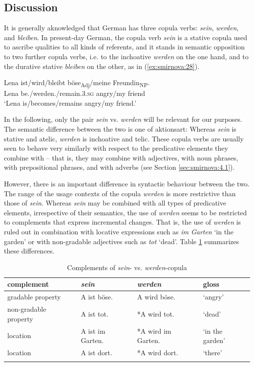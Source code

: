 \documentclass[output=paper,colorlinks,citecolor=brown]{langscibook}
\begin{document}
\subsection{Discussion} \label{sec:smirnova:4.3}
It is generally aknowledged that German has three copula verbs: \textit{sein}, \textit{werden}, and \textit{bleiben}. In present-day German, the copula verb \emph{sein} is a stative copula used to ascribe qualities to all kinds of referents, and it stands in semantic opposition to two further copula verbs, i.e. to the inchoative \emph{werden} on the one hand, and to the durative stative \emph{bleiben} on the other, as in (\ref{ex:smirnova:28}).

\ea\label{ex:smirnova:28}
\gll Lena ist/wird/bleibt böse\textsubscript{Adj}/meine Freundin\textsubscript{NP}.\\
    Lena be./werden./remain.\textsc{3.sg} angry/my friend \\
\glt `Lena is/becomes/remains angry/my friend.'
\z

In the following, only the pair \emph{sein} vs. \emph{werden} will be relevant for our purposes. The semantic difference between the two is one of aktionsart: Whereas \emph{sein} is stative and atelic, \emph{werden} is inchoative and telic. These copula verbs are usually seen to behave very similarly with respect to the predicative elements they combine with -- that is, they may combine with adjectives, with noun phrases, with prepositional phrases, and with adverbs (see Section \ref{sec:smirnova:4.1}). 
\par However, there is an important difference in syntactic behaviour between the two. The range of the usage contexts of the copula \emph{werden} is more restrictive than those of \textit{sein}. Whereas \emph{sein} may be combined with all types of predicative elements, irrespective of their semantics, the use of \textit{werden} seems to be restricted to complements that express incremental changes. That is, the use of \textit{werden} is ruled out in combination with locative expressions such as \textit{im Garten} `in the garden' or with non-gradable adjectives such as \textit{tot} `dead'. Table \ref{tab:smirnova:6} summarizes these differences. 

\begin{table}
 \caption{Complements of \emph{sein}- vs. \emph{werden}-copula}
\label{tab:smirnova:6}
\small
 \begin{tabularx}{\textwidth}{llll}
  \lsptoprule
   complement & \emph{sein} & \emph{werden} & gloss\\
  \midrule
  gradable property  &  A ist böse. & A wird böse. & `angry'\\
  non-gradable property & A ist tot. & *A wird tot. & `dead'\\
  location & A ist im Garten. & *A wird im Garten. & `in the garden'\\
  location & A ist dort. & *A wird dort. & `there'\\
   \lspbottomrule
 \end{tabularx}
\end{table}
\end{document}
